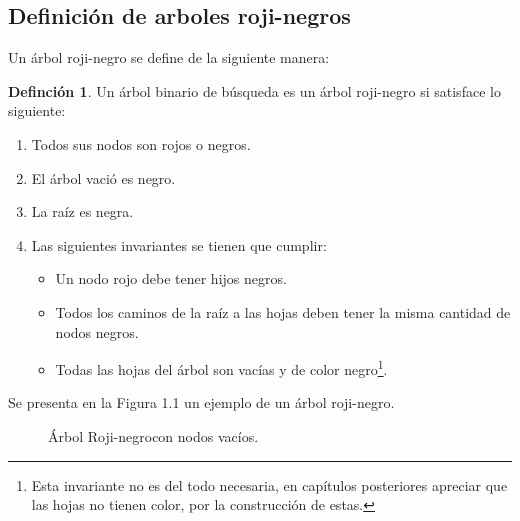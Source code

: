 \documentclass[letterpaper,12pt,oneside]{book}
\newcommand{\Arn}{Árbol Roji-negro}
\newcommand{\arn}{árbol roji-negro}
\newcommand{\arns}{arboles roji-negros}
\theoremstyle{plain}
\theoremstyle{definition}
\newtheorem{defn}{Definci\'on}[section]
\theoremstyle{remark}
\begin{document}
\subsection{Definici\'on de {\arns}}
Un {{{\arn}}} se define de la siguiente manera:
\begin{defn}
Un \'arbol binario de búsqueda es un {\arn} si satisface lo siguiente:
\begin{enumerate}
    \item Todos sus nodos son rojos o negros.
    \item El \'arbol vació es negro.
    \item La raíz es negra.
    \item Las siguientes invariantes se tienen que cumplir:
    \begin{itemize}
        \item Un nodo rojo debe tener hijos negros.
        \item Todos los caminos de la raíz a las hojas deben tener la misma cantidad de nodos negros.
        \item Todas las hojas del \'arbol son vacías y de color negro\footnote{Esta invariante no es del 
        todo necesaria, en capítulos posteriores apreciar que las hojas no tienen color, por la 
        construcción de estas.}.
    \end{itemize}
\end{enumerate}
\end{defn}
Se presenta en la Figura 1.1 un ejemplo de un {\arn}.

\begin{figure}
\centering 
\captionsetup{justification=centering}
\label{arbolRB}
\caption {\Arn con nodos vac\'ios.}
\end{figure}
\end{document}
